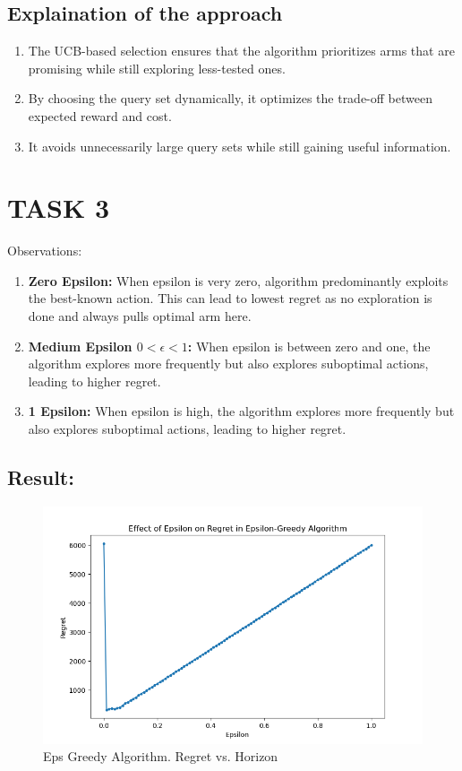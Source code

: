 \documentclass{article}
\begin{document}
\subsection{Explaination of the approach}
\begin{enumerate}
    \item The UCB-based selection ensures that the algorithm prioritizes arms that are promising while still exploring less-tested ones.
    \item By choosing the query set dynamically, it optimizes the trade-off between expected reward and cost.
    \item It avoids unnecessarily large query sets while still gaining useful information.

\end{enumerate}

\newpage
\section*{TASK 3}
Observations: 
\begin{enumerate}
    \item \textbf{Zero Epsilon:} When epsilon is very zero, algorithm predominantly exploits the best-known action. This can lead to lowest regret as no exploration is done and always pulls optimal arm here.
    \item \textbf{Medium Epsilon $0 < \epsilon < 1$:} When epsilon is between zero and one, the algorithm explores more frequently but also explores suboptimal actions, leading to higher regret.
    \item \textbf{1 Epsilon:} When epsilon is high, the algorithm explores more frequently but also explores suboptimal actions, leading to higher regret.
\end{enumerate}

\subsection*{Result:}

\begin{figure}[hb]
    \centering
    \includegraphics[width=0.68\linewidth]{../imgs/task3_regret_vs_epsilon.png}
    \caption{Eps Greedy Algorithm. Regret vs. Horizon}\label{fig:eps_greedy}
\end{figure}
\end{document}
